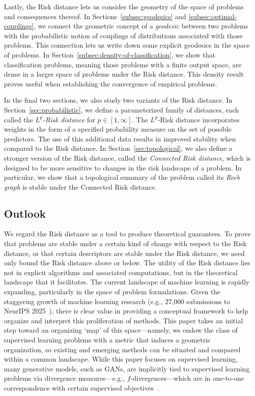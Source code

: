 \documentclass[twoside,11pt]{article}
\begin{document}
Lastly, the Risk distance lets us consider the geometry of the space of problems and consequences thereof. In Sections~\ref{subsec:geodesics} and \ref{subsec:optimal-couplings}, we connect the geometric concept of a \emph{geodesic} between two problems with the probabilistic notion of couplings of distributions associated with those problems. This connection lets us write down some explicit geodesics in the space of problems. In Section~\ref{subsec:density-of-classification}, we show that classification problems, meaning those problems with a finite output space, are dense in a larger space of problems under the Risk distance. This density result proves useful when establishing the convergence of empirical problems.

In the final two sections, we also study two variants of the Risk distance. In Section~\ref{sec:probabilistic}, we define a parameterized family of distances, each called the \emph{$L^p$-Risk distance} for $p\in [1,\infty]$. The $L^p$-Risk distance incorporates weights in the form of a specified probability measure on the set of possible predictors. The use of this additional data results in improved stability when compared to the Risk distance. In Section~\ref{sec:topological}, we also define a stronger version of the Risk distance, called the \emph{Connected Risk distance}, which is designed to be more sensitive to changes in the risk landscape of a problem. In particular, we show that a topological summary of the problem called its \emph{Reeb graph} is stable under the Connected Risk distance. 



\subsection{Outlook}


We regard the Risk distance as a tool to produce theoretical guarantees. To prove that problems are stable under a certain kind of change with respect to the Risk distance, or that certain descriptors are stable under the Risk distance, we need only bound the Risk distance above or below. The utility of the Risk distance lies not in explicit algorithms and associated computations, but in the theoretical landscape that it facilitates. The current landscape of machine learning is rapidly expanding, particularly in the space of problem formulations. Given the staggering growth of machine learning research (e.g., 27,000 submissions to NeurIPS 2025~\citep{neurips2025submissions}), there is clear value in providing a conceptual framework to help organize and interpret this proliferation of methods. This paper takes an initial step toward an organizing ‘map’ of this space—namely, we endow the class of supervised learning problems with a metric that induces a geometric organization, so existing and emerging methods can be situated and compared within a common landscape. While this paper focuses on supervised learning, many generative models, such as GANs, are implicitly tied to supervised learning problems via divergence measures—e.g., $f$-divergences—which are in one-to-one correspondence with certain supervised objectives~\citep{nowozin2016fgan,williamson_information_2024}.
\end{document}

